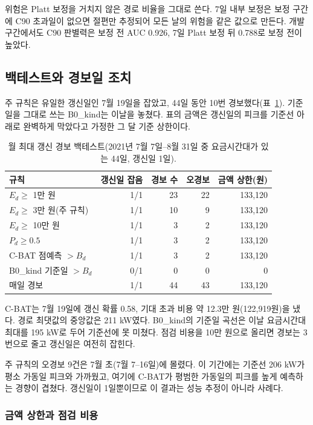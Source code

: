 위험은 Platt 보정을 거치지 않은 경로 비율을 그대로 쓴다. 7일 내부 보정은 보정 구간에 C90 초과일이 없으면 절편만 추정되어 모든 날의 위험을 같은 값으로 만든다. 개발 구간에서도 C90 판별력은 보정 전 AUC 0.926, 7일 Platt 보정 뒤 0.788로 보정 전이 높았다.

\subsection{백테스트와 경보일 조치}

주 규칙은 유일한 갱신일인 7월 19일을 잡았고, 44일 동안 10번 경보했다(표~\ref{tab:ch5-alarm}). 기준일을 그대로 쓰는 B0\_kind는 이날을 놓쳤다. 표의 금액은 갱신일의 피크를 기준선 아래로 완벽하게 막았다고 가정한 그 달 기준 상한이다.

\begin{table}[h]
\centering
\caption{월 최대 갱신 경보 백테스트(2021년 7월 7일--8월 31일 중 요금시간대가 있는 44일, 갱신일 1일).}
\label{tab:ch5-alarm}
\small
\begin{tabular}{lrrrr}
\toprule
규칙 & 갱신일 잡음 & 경보 수 & 오경보 & 금액 상한(원) \\
\midrule
$E_d \ge$ 1만 원 & 1/1 & 23 & 22 & 133,120 \\
$E_d \ge$ 3만 원(주 규칙) & 1/1 & 10 & 9 & 133,120 \\
$E_d \ge$ 10만 원 & 1/1 & 3 & 2 & 133,120 \\
$P_d \ge 0.5$ & 1/1 & 3 & 2 & 133,120 \\
C-BAT 점예측 $> B_d$ & 1/1 & 3 & 2 & 133,120 \\
B0\_kind 기준일 $> B_d$ & 0/1 & 0 & 0 & 0 \\
매일 경보 & 1/1 & 44 & 43 & 133,120 \\
\bottomrule
\end{tabular}
\end{table}

C-BAT는 7월 19일에 갱신 확률 0.58, 기대 초과 비용 약 12.3만 원(122,919원)을 냈다. 경로 최댓값의 중앙값은 211 kW였다. B0\_kind의 기준일 곡선은 이날 요금시간대 최대를 195 kW로 두어 기준선에 못 미쳤다. 점검 비용을 10만 원으로 올리면 경보는 3번으로 줄고 갱신일은 여전히 잡힌다.

주 규칙의 오경보 9건은 7월 초(7월 7--16일)에 몰렸다. 이 기간에는 기준선 206 kW가 평소 가동일 피크와 가까웠고, 여기에 C-BAT가 평범한 가동일의 피크를 높게 예측하는 경향이 겹쳤다. 갱신일이 1일뿐이므로 이 결과는 성능 추정이 아니라 사례다.

\subsubsection{금액 상한과 점검 비용}

